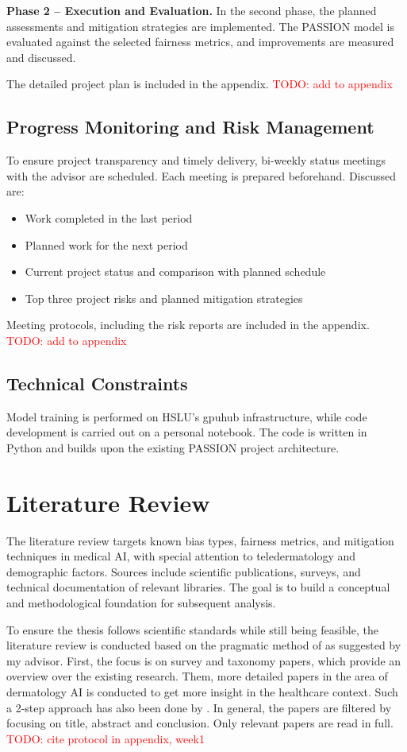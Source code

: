 \documentclass[12pt, a4paper, oneside]{book}   	%
\renewcommand{\todo}[1]{\textcolor{red}{TODO: #1}}
\begin{document}
		\textbf{Phase 2 – Execution and Evaluation.} In the second phase, the planned assessments and mitigation strategies are implemented. The PASSION model is evaluated against the selected fairness metrics, and improvements are measured and discussed.
		
		The detailed project plan is included in the appendix. \todo{add to appendix}
		
		\subsection{Progress Monitoring and Risk Management}
		To ensure project transparency and timely delivery, bi-weekly status meetings with the advisor are scheduled. Each meeting is prepared beforehand. Discussed are:
		\begin{itemize}
			\item Work completed in the last period
			\item Planned work for the next period
			\item Current project status and comparison with planned schedule
			\item Top three project risks and planned mitigation strategies
		\end{itemize}
		
		Meeting protocols, including the risk reports are included in the appendix. \todo{add to appendix}
		
		\subsection{Technical Constraints}
		Model training is performed on \gls{HSLU}'s \gls{gpuhub} infrastructure, while code development is carried out on a personal notebook. The code is written in Python and builds upon the existing PASSION project architecture.
		
		
		\section{Literature Review}
		The literature review targets known bias types, fairness metrics, and mitigation techniques in medical \gls{AI}, with special attention to \gls{teledermatology} and demographic factors. Sources include scientific publications, surveys, and technical documentation of relevant libraries. The goal is to build a conceptual and methodological foundation for subsequent analysis.
		
		To ensure the thesis follows scientific standards while still being feasible, the literature review is conducted based on the pragmatic method of \textcite{Alake_2021} as suggested by my advisor. First, the focus is on survey and taxonomy papers, which provide an overview over the existing research. Them, more detailed papers in the area of dermatology \gls{AI} is conducted to get more insight in the healthcare context. Such a 2-step approach has also been done by \textcite{Chen_2024}. In general, the papers are filtered by focusing on title, abstract and conclusion. Only relevant papers are read in full. \todo{cite protocol in appendix, week1}
		
\end{document}
